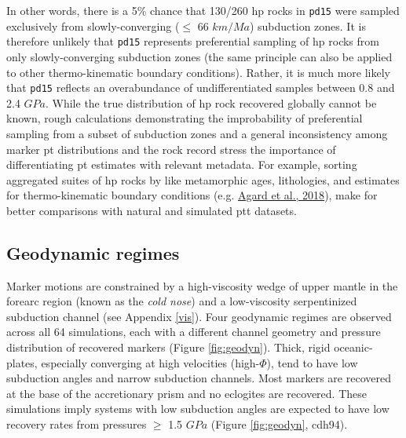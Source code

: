 In other words, there is a 5\% chance that 130/260 \gls{hp} rocks in \texttt{pd15} were sampled exclusively from slowly-converging (\(\leq\) 66 \(km/Ma\)) subduction zones. It is therefore unlikely that \texttt{pd15} represents preferential sampling of \gls{hp} rocks from only slowly-converging subduction zones (the same principle can also be applied to other thermo-kinematic boundary conditions). Rather, it is much more likely that \texttt{pd15} reflects an overabundance of undifferentiated samples between 0.8 and 2.4 \(GPa\). While the true distribution of \gls{hp} rock recovered globally cannot be known, rough calculations demonstrating the improbability of preferential sampling from a subset of subduction zones and a general inconsistency among marker \gls{pt} distributions and the rock record stress the importance of differentiating \gls{pt} estimates with relevant metadata. For example, sorting aggregated suites of \gls{hp} rocks by like metamorphic ages, lithologies, and estimates for thermo-kinematic boundary conditions (e.g. \protect\hyperlink{ref-agard2018}{Agard et al., 2018}), make for better comparisons with natural and simulated \gls{ptt} datasets.

\hypertarget{geodynamics}{%
\subsection{Geodynamic regimes}\label{geodynamics}}

Marker motions are constrained by a high-viscosity wedge of upper mantle in the forearc region (known as the \emph{cold nose}) and a low-viscosity serpentinized subduction channel (see Appendix \ref{vis}). Four geodynamic regimes are observed across all 64 simulations, each with a different channel geometry and pressure distribution of recovered markers (Figure \ref{fig:geodyn}). Thick, rigid oceanic-plates, especially converging at high velocities (high-\(\Phi\)), tend to have low subduction angles and narrow subduction channels. Most markers are recovered at the base of the accretionary prism and no eclogites are recovered. These simulations imply systems with low subduction angles are expected to have low recovery rates from pressures \(\geq\) 1.5 \(GPa\) (Figure \ref{fig:geodyn}, cdh94).



